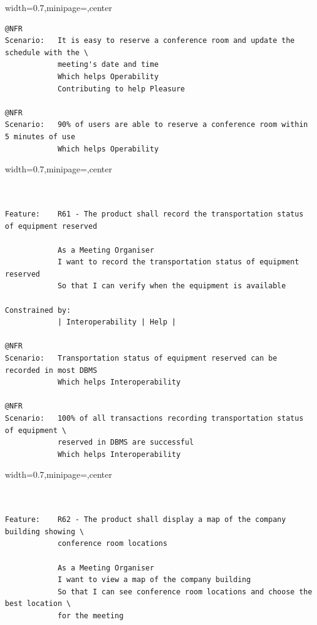 \documentclass[dissertation,final]{softeng}
\newenvironment{featurecode}[1]
{ \lrbox\featurebox \begin{adjustbox}{width=#1\textwidth,minipage=\textwidth,center} }
{ \end{adjustbox}\endlrbox}
\newenvironment{featurelist}[2]
{
\newcommand{\setcaption}{\caption{#1}}
\newcommand{\setlabel}{\label{#2}}
}
{\begin{listing}[h!]\centering\usebox\featurebox\setcaption\setlabel\end{listing}}
\begin{document}
\begin{appendices}
\begin{featurelist}{R60 -- Each time a conference room is reserved the schedule shall be updated}{lst:feature_r60}
\begin{featurecode}{0.7}
\begin{verbatim}
@NFR
Scenario:   It is easy to reserve a conference room and update the schedule with the \
            meeting's date and time
            Which helps Operability
            Contributing to help Pleasure

@NFR	
Scenario:   90% of users are able to reserve a conference room within 5 minutes of use
            Which helps Operability
\end{verbatim}
\end{featurecode}
\end{featurelist}

\begin{featurelist}{R61 -- The product shall record the transportation status of equipment reserved}{lst:feature_r61}
\begin{featurecode}{0.7}
\begin{verbatim}


Feature:    R61 - The product shall record the transportation status of equipment reserved

            As a Meeting Organiser
            I want to record the transportation status of equipment reserved
            So that I can verify when the equipment is available
	
Constrained by:
            | Interoperability | Help |

@NFR	
Scenario:   Transportation status of equipment reserved can be recorded in most DBMS
            Which helps Interoperability

@NFR	
Scenario:   100% of all transactions recording transportation status of equipment \
            reserved in DBMS are successful
            Which helps Interoperability
\end{verbatim}
\end{featurecode}
\end{featurelist}
\clearpage

\begin{featurelist}{R62 -- The product shall display a map of the company building}{lst:feature_r62}
\begin{featurecode}{0.7}
\begin{verbatim}


Feature:    R62 - The product shall display a map of the company building showing \
            conference room locations

            As a Meeting Organiser
            I want to view a map of the company building
            So that I can see conference room locations and choose the best location \
            for the meeting
	

\end{verbatim}
\end{featurecode}
\end{featurelist}
\end{appendices}
\end{document}
